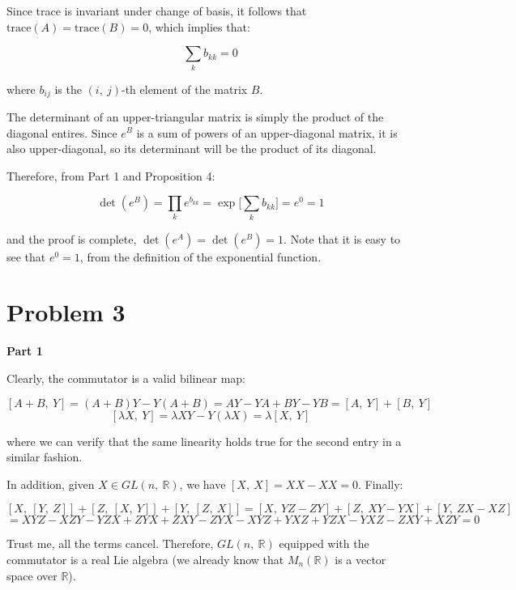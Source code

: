 \documentclass[10pt, oneside]{article}
\begin{document}
    Since trace is invariant under change of basis, it follows that $\text{trace}(A) = \text{trace}(B) = 0$, which implies that:

    $$\displaystyle\sum_{k} b_{kk} = 0$$

    where $b_{ij}$ is the $(i, \ j)$-th element of the matrix $B$.
    \newline

    The determinant of an upper-triangular matrix is simply the product of the diagonal entires. Since $e^B$ is a sum of powers of an
    upper-diagonal matrix, it is also upper-diagonal, so its determinant will be the product of its diagonal.
    \newline

    Therefore, from Part 1 and Proposition 4:

    $$\det(e^{B}) = \displaystyle\prod_{k} e^{b_{kk}} = \exp \Big[ \displaystyle\sum_{k} b_{kk} \Big] = e^0 = 1$$

    and the proof is complete, $\det(e^A) = \det(e^B) = 1$. Note that it is easy to see that $e^0 = 1$, from the definition of the exponential function.

    \section{Problem 3}

    \textbf{Part 1}
    \newline

    Clearly, the commutator is a valid bilinear map:

    $$[A + B, \ Y] = (A + B)Y - Y(A + B) = AY - YA + BY - YB = [A, \ Y] + [B, \ Y]$$
    $$[\lambda X, \ Y] = \lambda X Y - Y (\lambda X) = \lambda [X, \ Y]$$

    where we can verify that the same linearity holds true for the second entry in a similar fashion.
    \newline
    
    In addition, given $X \in GL(n, \ \mathbb{R})$, we have $[X, \ X] = XX - XX = 0$. Finally:

    $$[X, \ [Y, \ Z]] + [Z, \ [X, \ Y]] + [Y, \ [Z, \ X]] = [X, \ YZ - ZY] + [Z, \ XY - YX] + [Y, \ ZX - XZ]$$
    $$ = XYZ - XZY - YZX + ZYX + ZXY - ZYX - XYZ + YXZ + YZX - YXZ - ZXY + XZY = 0$$

    Trust me, all the terms cancel. Therefore, $GL(n, \ \mathbb{R})$ equipped with the commutator
    is a real Lie algebra (we already know that $M_{n}(\mathbb{R})$ is a vector space over $\mathbb{R}$).
    \newline
\end{document}
